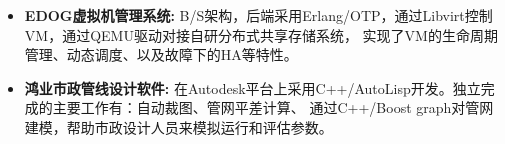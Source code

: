 \begin{itemize}[leftmargin=*]
      \item \textbf{EDOG虚拟机管理系统:} B/S架构，后端采用Erlang/OTP，通过Libvirt控制VM，通过QEMU驱动对接自研分布式共享存储系统，
          实现了VM的生命周期管理、动态调度、以及故障下的HA等特性。

      \item \textbf{鸿业市政管线设计软件:} 在Autodesk平台上采用C++/AutoLisp开发。独立完成的主要工作有：自动裁图、管网平差计算、
          通过C++/Boost graph对管网建模，帮助市政设计人员来模拟运行和评估参数。

  \end{itemize}
